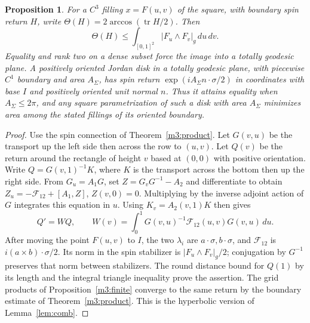 \documentclass[11pt,reqno]{amsart}
\newtheorem{proposition}[theorem]{Proposition}
\theoremstyle{definition}
\theoremstyle{remark}
\numberwithin{equation}{section}
\begin{document}
\begin{proposition}\label{m3:areaBound}
For a \(C^3\) filling \(x=F(u,v)\) of the square, with boundary
spin return \(H\), write \(\Theta(H)=2\arccos(\operatorname{tr}H/2)\).
Then
\[
 \Theta(H)\le\int_{[0,1]^2}|F_u\wedge F_v|_g\,du\,dv .
\]
Equality and rank two on a dense subset force the image into a
totally geodesic plane. A positively oriented Jordan disk in a
totally geodesic plane, with piecewise \(C^1\) boundary and area
\(A_\Sigma\), has spin return \(\exp(iA_\Sigma n\cdot\sigma/2)\)
in coordinates with base \(I\) and positively oriented unit normal
\(n\). Thus it attains equality when \(A_\Sigma\le2\pi\), and any
square parametrization of such a disk with area \(A_\Sigma\) minimizes
area among the stated fillings of its oriented boundary.
\end{proposition}
\begin{proof}
Use the spin connection of Theorem~\ref{m3:product}. Let \(G(v,u)\)
be the transport up the left side then across the row to \((u,v)\).
Let \(Q(v)\) be the return around the rectangle of height \(v\)
based at \((0,0)\) with positive orientation. Write \(Q=G(v,1)^{-1}K\),
where \(K\) is the transport across the bottom then up the right side.
From \(G_u=A_1G\), set \(Z=G_vG^{-1}-A_2\) and differentiate
to obtain \(Z_u=-\mathcal F_{12}+[A_1,Z]\), \(Z(v,0)=0\).
Multiplying by the inverse adjoint action of \(G\) integrates
this equation in \(u\). Using \(K_v=A_2(v,1)K\) then gives
\[
 Q'=WQ,\qquad
 W(v)=\int_0^1 G(v,u)^{-1}\mathcal F_{12}(u,v)G(v,u)\,du .
\]
After moving the point \(F(u,v)\) to \(I\), the two \(\lambda_i\)
are \(a\cdot\sigma,b\cdot\sigma\), and \(\mathcal F_{12}\)
is \(i(a\times b)\cdot\sigma/2\).
Its norm in the spin stabilizer is \(|F_u\wedge F_v|_g/2\);
conjugation by \(G^{-1}\) preserves that norm between stabilizers.
The round distance bound for \(Q(1)\) by its length and the integral
triangle inequality prove the assertion. The grid products of
Proposition~\ref{m3:finite} converge to the same return by the
boundary estimate of Theorem~\ref{m3:product}. This is the
hyperbolic version of Lemma~\ref{lem:comb}.


\end{proof}
\end{document}
